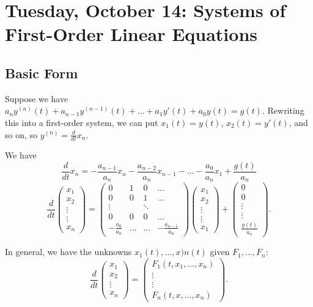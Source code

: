 \documentclass{tufte-handout}
\theoremstyle{definition}
\begin{document}
\section{Tuesday, October 14: Systems of First-Order Linear Equations}
\subsection{Basic Form}


Suppose we have $a_n y^{(n)}(t) + a_{n-1} y^{(n-1)}(t) + \ldots+ a_1y'(t) + a_0y(t) = g(t)$.
Rewriting this into a first-order system, we can put $x_1(t) = y(t)$, $x_2(t) = y'(t)$, and so on, so $y^{(n)} = \frac{d}{dt} x_n$. 

We have \[
	\frac{d}{dt} x_n = -\frac{a_{n-1}}{a_n}x_n - \frac{a_{n-2}}{a_n}x_{n-1} - \ldots - \frac{a_0}{a_n} x_1 + \frac{g(t)}{a_n}
\] \[
	\frac{d}{dt} \begin{pmatrix}
	x_1 \\
	x_2 \\
	\vdots \\
	\vdots \\
	x_n
	\end{pmatrix} = \begin{pmatrix}
	0 & 1 & 0 & \ldots \\
	0 & 0 & 1 & \ldots \\
	\vdots & & \ddots & \\
	0 & 0 & 0 & \ldots \\
	-\frac{a_0}{a_n} & \ldots & \ldots & - \frac{a_{n-1}}{a_n}
	\end{pmatrix} \begin{pmatrix}
	x_1  \\
	x_2 \\
	\vdots \\
	\vdots \\
	x_1
	\end{pmatrix} + \begin{pmatrix}
	0  \\
	0 \\
	\vdots \\
	\vdots \\
	\frac{g(t)}{a_n}
	\end{pmatrix} 
.\]

In general, we have the unknowns $x_1(t),\ldots,x)n(t)$ given $F_1,\ldots,F_n$: \[
	\frac{d}{dt} \begin{pmatrix}
	x_1  \\
	x_2 \\
	\vdots \\
	x_n
	\end{pmatrix} = \begin{pmatrix}
	F_1(t,x_1,\ldots,x_n) \\
	\vdots \\
	\vdots \\
	F_n(t,x,\ldots,x_n)
	\end{pmatrix} 
.\] 
\end{document}
